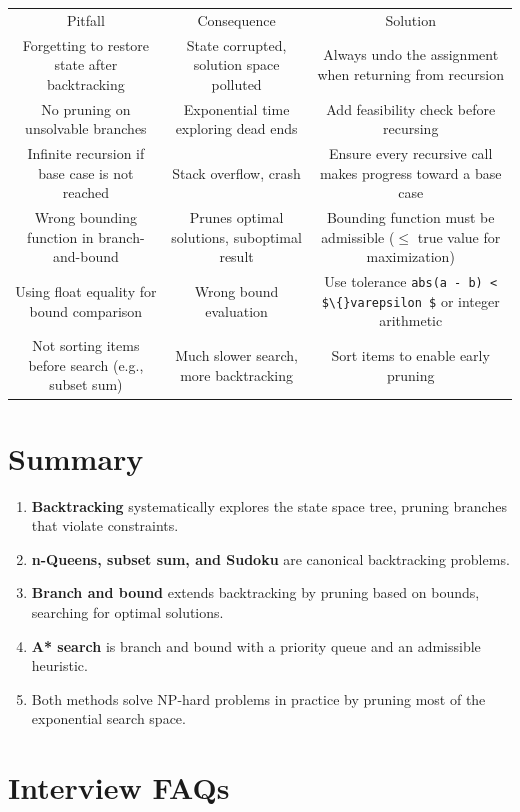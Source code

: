 \begin{center}
\begin{tabular}{ccc}
\toprule
Pitfall & Consequence & Solution \\
Forgetting to restore state after backtracking & State corrupted, solution space polluted & Always undo the assignment when returning from recursion \\
No pruning on unsolvable branches & Exponential time exploring dead ends & Add feasibility check before recursing \\
Infinite recursion if base case is not reached & Stack overflow, crash & Ensure every recursive call makes progress toward a base case \\
Wrong bounding function in branch-and-bound & Prunes optimal solutions, suboptimal result & Bounding function must be admissible ($\le $ true value for maximization) \\
Using float equality for bound comparison & Wrong bound evaluation & Use tolerance \texttt{abs(a - b) < \$\textbackslash\{\}varepsilon \$} or integer arithmetic \\
Not sorting items before search (e.g., subset sum) & Much slower search, more backtracking & Sort items to enable early pruning \\

\bottomrule
\end{tabular}
\end{center}
\section{Summary}

\begin{enumerate}
\item \textbf{Backtracking} systematically explores the state space tree, pruning branches that violate constraints.
\item \textbf{n-Queens, subset sum, and Sudoku} are canonical backtracking problems.
\item \textbf{Branch and bound} extends backtracking by pruning based on bounds, searching for optimal solutions.
\item \textbf{A* search} is branch and bound with a priority queue and an admissible heuristic.
\item Both methods solve NP-hard problems in practice by pruning most of the exponential search space.
\end{enumerate}

\section{Interview FAQs}

